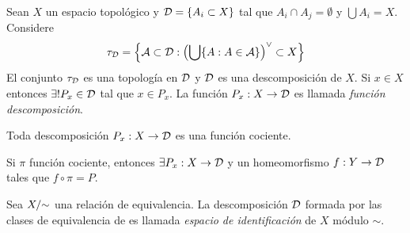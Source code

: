 \begin{proposition}
    Sean \(X\) un espacio topológico y \(\mathcal{D} = \{A_i\subset X\}\) tal que \(A_i\cap A_j = \emptyset \) y \(\bigcup A_i = X\). Considere 
    \[\tau_\D = \left\{\A\subset \D: \left(\bigcup \{A : A\in \A\}\right)^\ab\subset X \right\}\]
    El conjunto \(\tau_{\mathcal{D}} \) es una topología en \(\mathcal{D}\) y \(\mathcal{D}\) es una descomposición de \(X\). Si \(x\in X\) entonces \(\exists !P_x \in \mathcal{D} \) tal que \(x\in P_x\). La función \(P_x: X\to \mathcal{D}\) es llamada \emph{función descomposición}. 
\end{proposition}
\begin{proposition}
    Toda descomposición \(P_x:X\to \mathcal{D}\) es una función cociente. 
\end{proposition}
\begin{proposition}
    Si \(\pi\) función cociente, entonces \(\exists P_x:X\to \mathcal{D}\) y un homeomorfismo \(f:Y\to \mathcal{D}\) tales que \(f\circ \pi = P\). 
\end{proposition}
\begin{definition}
    Sea \(X /\hspace{-0.1cm} \sim\) una relación de equivalencia. La descomposición \(\mathcal{D}\) formada por las clases de equivalencia de es llamada \emph{espacio de identificación} de \(X\) módulo \(\sim\). 
\end{definition}

\E

